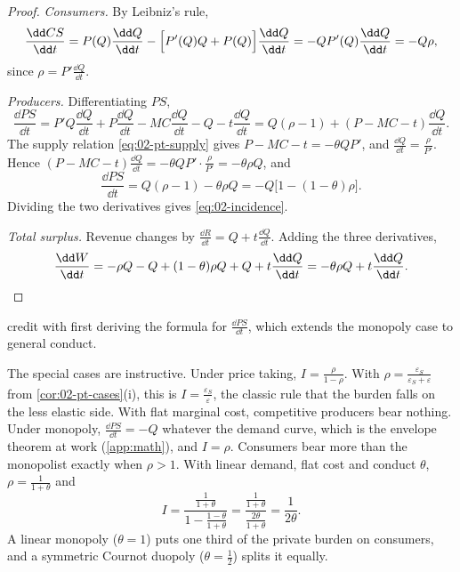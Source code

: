 \begin{proof}
\emph{Consumers.} By Leibniz's rule,
\begin{equation*}
\frac{\dd CS}{\dd t} = P(Q)\frac{\dd Q}{\dd t} - \Bigl[P'(Q)Q + P(Q)\Bigr]\frac{\dd Q}{\dd t} = -QP'(Q)\frac{\dd Q}{\dd t} = -Q\rho ,
\end{equation*}
since $\rho = P'\frac{\dd Q}{\dd t}$.

\emph{Producers.} Differentiating $PS$,
\begin{equation*}
\frac{\dd PS}{\dd t} = P'Q\frac{\dd Q}{\dd t} + P\frac{\dd Q}{\dd t} - MC\frac{\dd Q}{\dd t} - Q - t\frac{\dd Q}{\dd t}
= Q(\rho - 1) + (P - MC - t)\frac{\dd Q}{\dd t} .
\end{equation*}
The supply relation \eqref{eq:02-pt-supply} gives $P - MC - t = -\theta QP'$, and $\frac{\dd Q}{\dd t} = \frac{\rho}{P'}$.
Hence $(P - MC - t)\frac{\dd Q}{\dd t} = -\theta QP'\cdot\frac{\rho}{P'} = -\theta\rho Q$, and
\begin{equation*}
\frac{\dd PS}{\dd t} = Q(\rho - 1) - \theta\rho Q = -Q\bigl[1 - (1 - \theta)\rho\bigr] .
\end{equation*}
Dividing the two derivatives gives \eqref{eq:02-incidence}.

\emph{Total surplus.} Revenue changes by $\frac{\dd R}{\dd t} = Q + t\frac{\dd Q}{\dd t}$. Adding the three derivatives,
\begin{equation*}
\frac{\dd W}{\dd t} = -\rho Q - Q + (1 - \theta)\rho Q + Q + t\frac{\dd Q}{\dd t} = -\theta\rho Q + t\frac{\dd Q}{\dd t} .
\qedhere
\end{equation*}
\end{proof}

\citet[p.~546]{WeylFabinger2013} credit \citet{AtkinDonaldson2012} with first deriving the formula for
$\frac{\dd PS}{\dd t}$, which extends the monopoly case to general conduct.

The special cases are instructive. Under price taking, $I = \frac{\rho}{1 - \rho}$. With
$\rho = \frac{\varepsilon_S}{\varepsilon_S + \varepsilon}$ from \cref{cor:02-pt-cases}(i), this is
$I = \frac{\varepsilon_S}{\varepsilon}$, the classic rule that the burden falls on the less elastic side. With flat
marginal cost, competitive producers bear nothing. Under monopoly, $\frac{\dd PS}{\dd t} = -Q$ whatever the demand
curve, which is the envelope theorem at work (\cref{app:math}), and $I = \rho$. Consumers bear more than the
monopolist exactly when $\rho > 1$. With linear demand, flat cost and conduct $\theta$, $\rho = \frac{1}{1 + \theta}$
and
\begin{equation*}
I = \frac{\frac{1}{1 + \theta}}{1 - \frac{1 - \theta}{1 + \theta}} = \frac{\frac{1}{1 + \theta}}{\frac{2\theta}{1 + \theta}}
= \frac{1}{2\theta} .
\end{equation*}
A linear monopoly ($\theta = 1$) puts one third of the private burden on consumers, and a symmetric Cournot duopoly
($\theta = \frac{1}{2}$) splits it equally.

